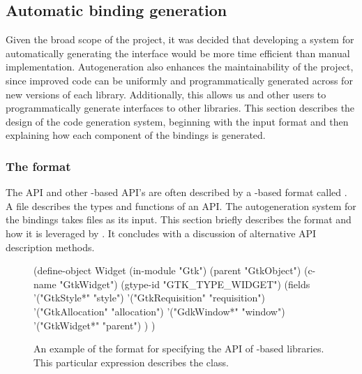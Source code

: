 \documentclass[article,shortnames]{jss}
\begin{document}
\subsection{Automatic binding generation}

Given the broad scope of the project, it was decided that developing a
system for automatically generating the interface would be more time
efficient than manual implementation. Autogeneration also enhances the
maintainability of the project, since improved code can be uniformly
and programmatically generated across for new versions of each
library. Additionally, this allows us and other users to
programmatically generate interfaces to other libraries. This section
describes the design of the code generation system, beginning with the
input format and then explaining how each component of the bindings is
generated.

\subsubsection[The defs format]{The  format}

The  API and other -based API's are often
described by
a -based \citep{scheme} format called . A
 file describes the types and functions of an API. The
autogeneration system for the  bindings takes
 files as its input. This section briefly describes the
 format and how it is leveraged by . It
concludes
with a discussion of alternative API description methods.

\begin{figure}[h!tbp]
\begin{Code}
(define-object Widget
  (in-module "Gtk")
  (parent "GtkObject")
  (c-name "GtkWidget")
  (gtype-id "GTK_TYPE_WIDGET")
  (fields
    '("GtkStyle*" "style")
    '("GtkRequisition" "requisition")
    '("GtkAllocation" "allocation")
    '("GdkWindow*" "window")
    '("GtkWidget*" "parent")
  )
)
\end{Code}
\caption{\label{fig:defs}An example of the  format for
specifying the API of -based libraries. This particular
expression describes the  class.}
\end{figure}
\end{document}
